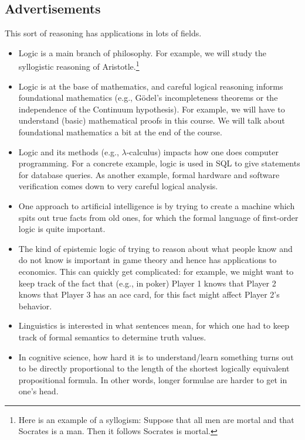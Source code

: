 \subsection{Advertisements}
This sort of reasoning has applications in lots of fields.
\begin{itemize}
	\item Logic is a main branch of philosophy. For example, we will study the syllogistic reasoning of Aristotle.\footnote{Here is an example of a syllogism: Suppose that all men are mortal and that Socrates is a man. Then it follows Socrates is mortal.}
	\item Logic is at the base of mathematics, and careful logical reasoning informs foundational mathematics (e.g., G\"odel's incompleteness theorems or the independence of the Continuum hypothesis). For example, we will have to understand (basic) mathematical proofs in this course. We will talk about foundational mathematics a bit at the end of the course.
	\item Logic and its methods (e.g., $\lambda$-calculus) impacts how one does computer programming. For a concrete example, logic is used in SQL to give statements for database queries. As another example, formal hardware and software verification comes down to very careful logical analysis.
	\item One approach to artificial intelligence is by trying to create a machine which spits out true facts from old ones, for which the formal language of first-order logic is quite important.
	\item The kind of epistemic logic of trying to reason about what people know and do not know is important in game theory and hence has applications to economics. This can quickly get complicated: for example, we might want to keep track of the fact that (e.g., in poker) Player 1 knows that Player 2 knows that Player 3 has an ace card, for this fact might affect Player 2's behavior.
	\item Linguistics is interested in what sentences mean, for which one had to keep track of formal semantics to determine truth values.
	\item In cognitive science, how hard it is to understand/learn something turns out to be directly proportional to the length of the shortest logically equivalent propositional formula. In other words, longer formulae are harder to get in one's head.
\end{itemize}

